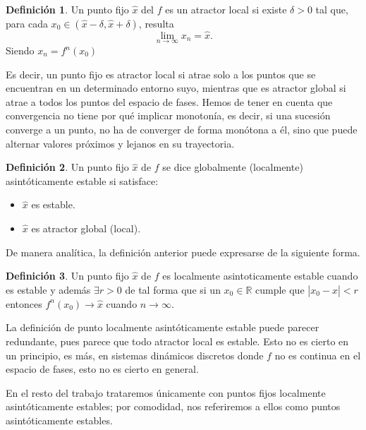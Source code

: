\documentclass[12pt,a4paper]{report}
\theoremstyle{definition}
\newtheorem{definicion}{Definición}[section]
\begin{document}
\begin{definicion}

Un punto fijo \(\hat{x}\) del $f$ es un atractor local si existe \(\delta > 0\) tal que, para cada \(x_0 \in (\hat{x} - \delta, \hat{x} + \delta)\), resulta
\[
\lim_{n \to \infty} x_n = \hat{x}.
\]
Siendo \(x_n = f^n(x_0)\)
\end{definicion}

Es decir, un punto fijo es atractor local si atrae solo a los puntos que se encuentran en un determinado entorno suyo, mientras que es atractor global si atrae a todos los puntos del espacio de fases. Hemos de tener en cuenta que convergencia no tiene por qué implicar monotonía, es decir, si una sucesión converge a un punto, no ha de converger de forma monótona a él, sino que puede alternar valores próximos y lejanos en su trayectoria.

\begin{definicion}

Un punto fijo $\hat{x}$ de $f$ se dice globalmente (localmente) asintóticamente estable si satisface:
\begin{itemize}
    \item $\hat{x}$ es estable.
    \item $\hat{x}$ es atractor global (local).
\end{itemize}

\end{definicion}

De manera analítica, la definición anterior puede expresarse de la siguiente forma.

\begin{definicion}

Un punto fijo $\hat{x} $ de  $f$ es localmente asintoticamente estable cuando es estable y además $\exists r > 0$ de tal forma que si un $x_0 \in \mathbb{R}$ cumple que $|x_0 - \hat{x}| < r$ entonces $f^n(x_0) \rightarrow \hat{x}$ cuando $n \rightarrow \infty$.

\end{definicion}

La definición de punto localmente asintóticamente estable puede parecer redundante, pues parece que todo atractor local es estable. Esto no es cierto en un principio, es más, en sistemas dinámicos discretos donde \(f\) no es continua en el espacio de fases, esto no es cierto en general.

En el resto del trabajo trataremos únicamente con puntos fijos localmente asintóticamente estables; por comodidad, nos referiremos a ellos como puntos asintóticamente estables.
\end{document}
